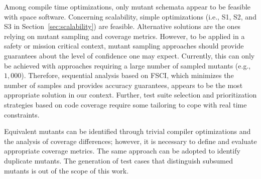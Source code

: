 Among compile time optimizations, only mutant schemata appear to be feasible with space software.
Concerning scalability, simple optimizations (i.e., S1, S2, and S3 in Section~\ref{sec:scalability}) are feasible. Alternative solutions are the ones relying on mutant sampling and coverage metrics. 
However, to be applied in a safety or mission critical context, mutant sampling approaches should provide guarantees about the 
level of confidence one may expect. Currently, this can only be achieved with approaches requiring a large number of sampled mutants (e.g., $1,000$).  Therefore, sequential analysis based on FSCI, which minimizes the number of samples and provides accuracy guarantees, appears to be the most appropriate solution in our context.
Further, test suite selection and prioritization strategies based on code coverage require some tailoring to cope with real time constraints.

Equivalent mutants can be identified through trivial compiler optimizations and the analysis of coverage differences; however, it is necessary to define and evaluate appropriate coverage metrics. The same approach can be adopted to identify duplicate mutants. The generation of test cases that distinguish subsumed mutants is out of the scope of this work.




